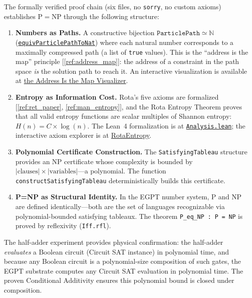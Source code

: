 \documentclass[11pt,a4paper]{article}
\begin{document}
The formally verified proof chain (six files, no \texttt{sorry}, no custom axioms) establishes $\mathrm{P} = \mathrm{NP}$ through the following structure:

\begin{enumerate}
    \item \textbf{Numbers as Paths.} A constructive bijection $\texttt{ParticlePath} \simeq \mathbb{N}$ (\href{https://eabadir.github.io/EGPT/Lean/EGPT/NumberTheory/Core.lean}{\texttt{equivParticlePathToNat}}) where each natural number corresponds to a maximally compressed path (a list of \texttt{true} values). This is the ``address is the map'' principle [\ref{ref:address_map}]: the address of a constraint in the path space \emph{is} the solution path to reach it. An interactive visualization is available at \href{https://eabadir.github.io/EGPT/www/the-address-is-the-map-visualizer/index.html}{the Address Is the Map Visualizer}.

    \item \textbf{Entropy as Information Cost.} Rota's five axioms are formalized [\ref{ref:ret_paper}, \ref{ref:man_entropy}], and the Rota Entropy Theorem proves that all valid entropy functions are scalar multiples of Shannon entropy: $H(n) = C \times \log(n)$. The Lean~4 formalization is at \href{https://eabadir.github.io/EGPT/Lean/EGPT/NumberTheory/Analysis.lean}{\texttt{Analysis.lean}}; the interactive axiom explorer is at \href{https://eabadir.github.io/EGPT/www/RotaEntropy/index.html}{RotaEntropy}.

    \item \textbf{Polynomial Certificate Construction.} The \texttt{SatisfyingTableau} structure provides an NP certificate whose complexity is bounded by $|\text{clauses}| \times |\text{variables}|$---a polynomial. The function \texttt{constructSatisfyingTableau} deterministically builds this certificate.

    \item \textbf{P=NP as Structural Identity.} In the EGPT number system, P and NP are defined identically---both are the set of languages recognizable via polynomial-bounded satisfying tableaux. The theorem \texttt{P\_eq\_NP : P = NP} is proved by reflexivity (\texttt{Iff.rfl}).
\end{enumerate}

The half-adder experiment provides physical confirmation: the half-adder \emph{evaluates} a Boolean circuit (Circuit SAT instance) in polynomial time, and because any Boolean circuit is a polynomial-size composition of such gates, the EGPT substrate computes any Circuit SAT evaluation in polynomial time. The proven Conditional Additivity ensures this polynomial bound is closed under composition.
\end{document}
